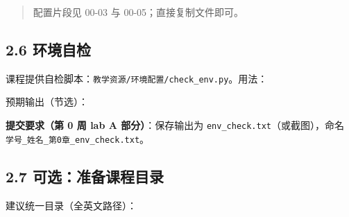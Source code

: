 \begin{quote}
配置片段见 00-03 与 00-05；直接复制文件即可。
\end{quote}

\subsection{2.6 环境自检}\label{ux73afux5883ux81eaux68c0}

课程提供自检脚本：\texttt{教学资源/环境配置/check\_env.py}。用法：

\begin{Shaded}
\begin{Highlighting}[]
\end{Highlighting}
\end{Shaded}

预期输出（节选）：

\begin{Shaded}
\begin{Highlighting}[]
\end{Highlighting}
\end{Shaded}

\textbf{提交要求（第 0 周 lab A 部分）}：保存输出为
\texttt{env\_check.txt}（或截图），命名
\texttt{学号\_姓名\_第0章\_env\_check.txt}。

\subsection{2.7
可选：准备课程目录}\label{ux53efux9009ux51c6ux5907ux8bfeux7a0bux76eeux5f55}

建议统一目录（全英文路径）：

\begin{Shaded}
\begin{Highlighting}[]
\end{Highlighting}
\end{Shaded}

